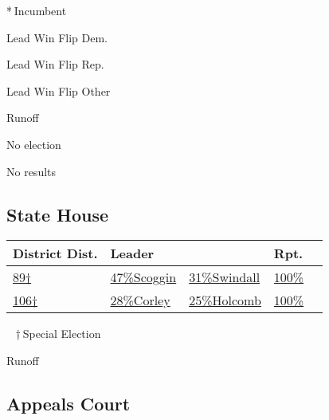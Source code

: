 * Incumbent~

 Lead Win Flip Dem.

 Lead Win Flip Rep.

 Lead Win Flip Other

 Runoff

 No election

 No results

\hypertarget{state-house}{%
\subsection{State House}\label{state-house}}

\begin{longtable}[]{@{}lllll@{}}
\toprule
District Dist. & Leader & & Rpt. &\tabularnewline
\midrule
\endhead
\href{//www.nytimes3xbfgragh.onion/elections/2016/results/mississippi-state-house-special-district-89}{89†}
&
\href{//www.nytimes3xbfgragh.onion/elections/2016/results/mississippi-state-house-special-district-89}{
47\%Scoggin} &
\href{//www.nytimes3xbfgragh.onion/elections/2016/results/mississippi-state-house-special-district-89}{
31\%Swindall} &
\href{//www.nytimes3xbfgragh.onion/elections/2016/results/mississippi-state-house-special-district-89}{100\%}
&
\href{//www.nytimes3xbfgragh.onion/elections/2016/results/mississippi-state-house-special-district-89}{}\tabularnewline
\href{//www.nytimes3xbfgragh.onion/elections/2016/results/mississippi-state-house-special-district-106}{106†}
&
\href{//www.nytimes3xbfgragh.onion/elections/2016/results/mississippi-state-house-special-district-106}{
28\%Corley} &
\href{//www.nytimes3xbfgragh.onion/elections/2016/results/mississippi-state-house-special-district-106}{
25\%Holcomb} &
\href{//www.nytimes3xbfgragh.onion/elections/2016/results/mississippi-state-house-special-district-106}{100\%}
&
\href{//www.nytimes3xbfgragh.onion/elections/2016/results/mississippi-state-house-special-district-106}{}\tabularnewline
\bottomrule
\end{longtable}

~ † Special Election

 Runoff

\hypertarget{appeals-court}{%
\subsection{Appeals Court}\label{appeals-court}}

